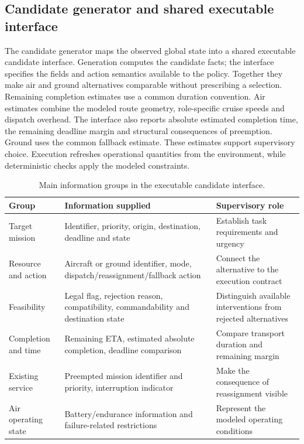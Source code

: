 \documentclass[]{interact}
\theoremstyle{plain}
\theoremstyle{definition}
\theoremstyle{remark}
\begin{document}
\subsection{Candidate generator and shared executable interface}

The candidate generator maps the observed global state into a shared executable candidate interface. Generation computes the candidate facts; the interface specifies the fields and action semantics available to the policy. Together they make air and ground alternatives comparable without prescribing a selection. Remaining completion estimates use a common duration convention. Air estimates combine the modeled route geometry, role-specific cruise speeds and dispatch overhead. The interface also reports absolute estimated completion time, the remaining deadline margin and structural consequences of preemption. Ground uses the common fallback estimate. These estimates support supervisory choice. Execution refreshes operational quantities from the environment, while deterministic checks apply the modeled constraints.

\begin{table}[!htbp]
\centering
\small
\setlength{\tabcolsep}{3pt}
\caption{Main information groups in the executable candidate interface.}
\label{tab:table1}
\begin{tabularx}{\textwidth}{@{}lYY@{}}
\toprule
Group & Information supplied & Supervisory role \\
\midrule
Target mission & Identifier, priority, origin, destination, deadline and state & Establish task requirements and urgency \\
Resource and action & Aircraft or ground identifier, mode, dispatch/reassignment/fallback action & Connect the alternative to the execution contract \\
Feasibility & Legal flag, rejection reason, compatibility, commandability and destination state & Distinguish available interventions from rejected alternatives \\
Completion and time & Remaining ETA, estimated absolute completion, deadline comparison & Compare transport duration and remaining margin \\
Existing service & Preempted mission identifier and priority, interruption indicator & Make the consequence of reassignment visible \\
Air operating state & Battery/endurance information and failure-related restrictions & Represent the modeled operating conditions \\
\bottomrule
\end{tabularx}
\end{table}
\end{document}

